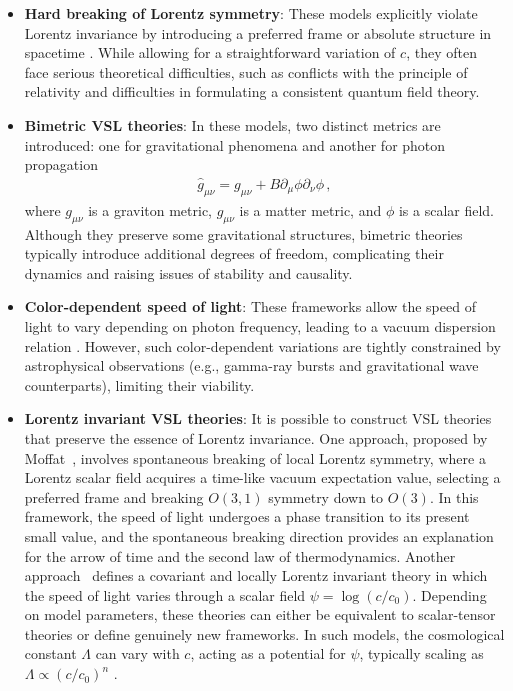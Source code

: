 \documentclass[jkps,preprint,fleqn]{revtex4} %
\begin{document}
\begin{itemize}
    \item \textbf{Hard breaking of Lorentz symmetry}:  
    These models explicitly violate Lorentz invariance by introducing a preferred frame or absolute structure in spacetime \cite{Coleman:1997xq,Albrecht:1998ir,Barrow:1998df,Barrow:1999is,Bassett:2000wj,Jacobson:2000xp,Magueijo:2000zt}.  While allowing for a straightforward variation of $c$, they often face serious theoretical difficulties, such as conflicts with the principle of relativity and difficulties in formulating a consistent quantum field theory.
    \item \textbf{Bimetric VSL theories}:  
    In these models, two distinct metrics are introduced: one for gravitational phenomena and another for photon propagation  \cite{Clayton:1998hv,Drummond:1999ut,Clayton:1999zs,Liberati:2000us,Clayton:2000xt,Drummond:2001rj}  
\begin{align}
\hat{g}_{\mu\nu} = g_{\mu\nu} + B \partial_{\mu} \phi \partial_{\nu} \phi \label{bimetric} \,,
\end{align}
where $g_{\mu\nu}$ is a graviton metric, $\hat{g}_{\mu\nu}$ is a matter metric, and $\phi$ is a scalar field. Although they preserve some gravitational structures, bimetric theories typically introduce additional degrees of freedom, complicating their dynamics and raising issues of stability and causality.
    \item \textbf{Color-dependent speed of light}:  
    These frameworks allow the speed of light to vary depending on photon frequency, leading to a vacuum dispersion relation \cite{Amelino-Camelia:1996bln,Amelino-Camelia:1997ieq,Ellis:1999sd,Amelino-Camelia:2000bxx,Amelino-Camelia:2000cpa,Ellis:2000sf,Kowalski-Glikman:2001vvk,Bruno:2001mw,Magueijo:2001cr,Amelino-Camelia:2002uql,Magueijo:2002pg}.  
    However, such color-dependent variations are tightly constrained by astrophysical observations (e.g., gamma-ray bursts and gravitational wave counterparts), limiting their viability.
    \item \textbf{Lorentz invariant VSL theories}:  
    It is possible to construct VSL theories that preserve the essence of Lorentz invariance. One approach, proposed by Moffat~\cite{Moffat:1992ud}, involves spontaneous breaking of local Lorentz symmetry, where a Lorentz scalar field acquires a time-like vacuum expectation value, selecting a preferred frame and breaking $O(3,1)$ symmetry down to $O(3)$. In this framework, the speed of light undergoes a phase transition to its present small value, and the spontaneous breaking direction provides an explanation for the arrow of time and the second law of thermodynamics. Another approach~\cite{Magueijo:2000zt} defines a covariant and locally Lorentz invariant theory in which the speed of light varies through a scalar field $\psi = \log(c/c_0)$. Depending on model parameters, these theories can either be equivalent to scalar-tensor theories or define genuinely new frameworks. In such models, the cosmological constant $\Lambda$ can vary with $c$, acting as a potential for $\psi$, typically scaling as $\Lambda \propto (c/c_0)^n$ \cite{Manida:1999rx,Barrow:1999st,Stepanov:1999ax,Magueijo:2000au,Moffat:2002nm}.

\end{itemize}
\end{document}
